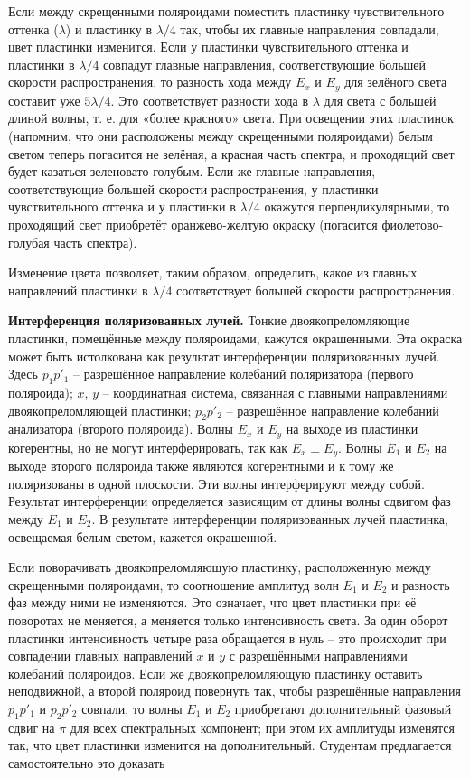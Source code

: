 \documentclass[12pt]{article}
\begin{document}
    Если между скрещенными поляроидами поместить пластинку чувствительного оттенка
    ($\lambda$) и пластинку в $\lambda/4$ так, чтобы их главные направления совпадали, цвет пластинки изменится.
    Если у пластинки чувствительного оттенка и пластинки в $\lambda/4$ совпадут главные направления, соответствующие большей скорости
    распространения, то разность хода между $E_x$ и $E_y$ для зелёного света составит уже $5\lambda/4$.
    Это соответствует разности хода в $\lambda$ для света с большей длиной волны, т. е. для «более красного» света.
    При освещении этих пластинок (напомним, что они расположены между скрещенными поляроидами) белым светом теперь погасится не зелёная, а красная
    часть спектра, и проходящий свет будет казаться зеленовато-голубым.
    Если же главные направления, соответствующие большей скорости распространения, у пластинки чувствительного оттенка и у пластинки
    в $\lambda/4$ окажутся перпендикулярными, то проходящий свет приобретёт
    оранжево-желтую окраску (погасится фиолетово-голубая часть спектра).

    Изменение цвета позволяет, таким образом, определить, какое из
    главных направлений пластинки в $\lambda/4$ соответствует большей скорости
    распространения.

    \textbf{Интерференция поляризованных лучей.}
    Тонкие двоякопреломляющие пластинки, помещённые между поляроидами, кажутся окрашенными.
    Эта окраска может быть истолкована как результат интерференции поляризованных лучей.
    Здесь $p_1p'_1$ -- разрешённое направление колебаний поляризатора (первого поляроида);
    $x$, $y$ -- координатная система, связанная с главными направлениями двоякопреломляющей пластинки;
    $p_2p'_2$ -- разрешённое направление колебаний анализатора (второго поляроида).
    Волны $E_x$ и $E_y$ на выходе из пластинки когерентны, но не могут интерферировать, так как $E_x \perp E_y$.
    Волны $E_1$ и $E_2$ на выходе второго поляроида также являются когерентными и к тому же поляризованы в одной плоскости.
    Эти волны интерферируют между собой.
    Результат интерференции определяется зависящим от длины волны сдвигом фаз между $E_1$ и $E_2$.
    В результате интерференции поляризованных лучей пластинка, освещаемая белым светом, кажется окрашенной.

    Если поворачивать двоякопреломляющую пластинку, расположенную между
    скрещенными поляроидами, то соотношение амплитуд волн $E_1$ и $E_2$ и разность фаз между ними не изменяются.
    Это означает, что цвет пластинки при её поворотах не меняется, а меняется только интенсивность света.
    За один оборот пластинки интенсивность четыре раза обращается в нуль -- это происходит при совпадении главных направлений
    $x$ и $y$ с разрешёнными направлениями колебаний поляроидов.
    Если же двоякопреломляющую пластинку оставить неподвижной, а второй поляроид повернуть так, чтобы разрешённые направления
    $p_1p'_1$ и $p_2p'_2$ совпали, то волны $E_1$ и $E_2$ приобретают дополнительный фазовый сдвиг на $\pi$
    для всех спектральных компонент;
    при этом их амплитуды изменятся так, что цвет пластинки изменится на дополнительный.
    Студентам предлагается самостоятельно это доказать
\end{document}

